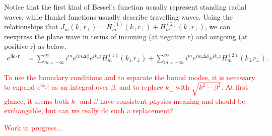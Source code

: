 \documentclass[]{report}
\begin{document}
Notice that the first kind of Bessel's function usually represent standing radial waves, while Hankel functions usually describe travelling waves. Using the relationships that $ J_{m}(k\!_\perp r\!_\perp)=H_{m}^{(1)}(k\!_\perp r\!_\perp)+H_{m}^{(2)}(k\!_\perp r\!_\perp) $, we can reexpress the plane wave in terms of incoming (at negative r) and outgoing (at positive r) as below.
\begin{align}
e^{i\mathbf{k}\cdot \mathbf{r}} &=\sum_{m=-\infty}^{\infty}i^me^{im\Delta\phi}e^{ik_{z}{z}} H_{m}^{(1)}(k\!_\perp r\!_\perp)+\sum_{m=-\infty}^{\infty}i^me^{im\Delta\phi}e^{ik_{z}{z}} H_{m}^{(2)}(k\!_\perp r\!_\perp).
\end{align}

\textcolor{red}{To use the boundary conditions and to separate the bound modes, it is necessary to expand $ e^{ik_{z}z} $ as an integral over $ \beta $, and to replace $ k\!_{\perp} $ with $ \sqrt{k^2-\beta^2} $. At first glance, it seems both $ k_z $ and $ \beta $ have consistent physics meaning and should be exchangable, but can we really do such a replacement?}



\textcolor{red}{Work in progress...} 



\appendix


%

\ifwindows
	
\else
	
\fi

\printindex
\end{document}
